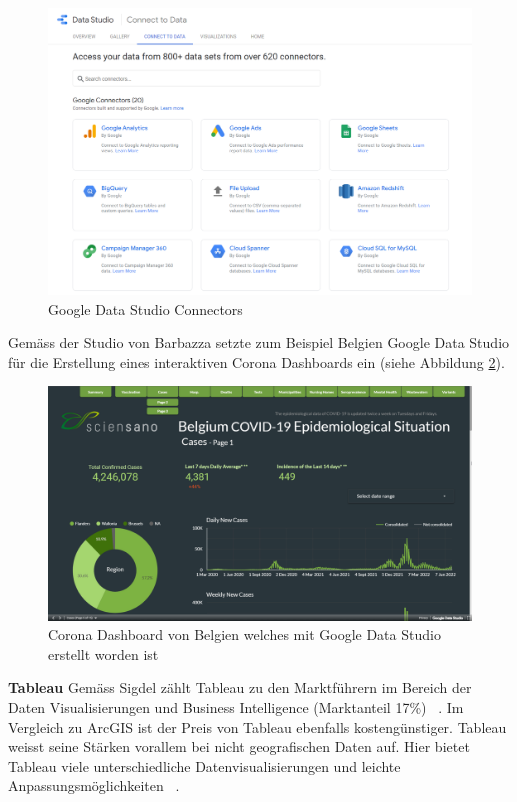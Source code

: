 \begin{figure}[h]
    \includegraphics[width=12cm]{images/google_data_studio_connectors.png}
    \centering
    \caption{Google Data Studio Connectors ~\citep{google_data_studio_connectors}}
    \label{fig:google_data_studio_connectors}
\end{figure}

\clearpage
Gemäss der Studio von Barbazza setzte zum Beispiel Belgien Google Data Studio für die Erstellung eines interaktiven Corona Dashboards ein (siehe Abbildung \ref{fig:google_data_studio_corona_dashboard}).

\begin{figure}[h]
    \includegraphics[width=12cm]{images/google_data_studio_covid_dashboard.png}
    \centering
    \caption{Corona Dashboard von Belgien welches mit Google Data Studio erstellt worden ist ~\citep{google_data_studio_corona_dashboard}}
    \label{fig:google_data_studio_corona_dashboard}
\end{figure}


\textbf{Tableau}
\newline
Gemäss Sigdel zählt Tableau zu den Marktführern im Bereich der Daten Visualisierungen und Business Intelligence (Marktanteil 17\%) ~\citep{arcgis_comparison}. Im Vergleich zu ArcGIS ist der Preis von Tableau ebenfalls kostengünstiger. Tableau weisst seine Stärken vorallem bei nicht geografischen Daten auf. Hier bietet Tableau viele unterschiedliche Datenvisualisierungen und leichte Anpassungsmöglichkeiten ~\citep{arcgis_comparison}.

